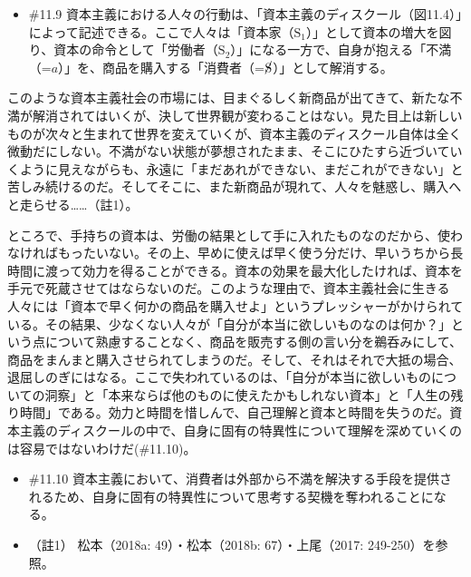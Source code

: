 \begin{note}{}
  \begin{itemize}
    \tightlist
    \item{\#11.9}
      資本主義における人々の行動は、「資本主義のディスクール（図11.4）」によって記述できる。ここで人々は「資本家（$\textrm{S}_1$）」として資本の増大を図り、資本の命令として「労働者（$\textrm{S}_2$）」になる一方で、自身が抱える「不満（=$a$）」を、商品を購入する「消費者（=$\cancel{\textrm{S}}$）」として解消する。
  \end{itemize}
\end{note}

このような資本主義社会の市場には、目まぐるしく新商品が出てきて、新たな不満が解消されてはいくが、決して世界観が変わることはない。見た目上は新しいものが次々と生まれて世界を変えていくが、資本主義のディスクール自体は全く微動だにしない。不満がない状態が夢想されたまま、そこにひたすら近づいていくように見えながらも、永遠に「まだあれができない、まだこれができない」と苦しみ続けるのだ。そしてそこに、また新商品が現れて、人々を魅惑し、購入へと走らせる\ldots\ldots（註1）。

ところで、手持ちの資本は、労働の結果として手に入れたものなのだから、使わなければもったいない。その上、早めに使えば早く使う分だけ、早いうちから長時間に渡って効力を得ることができる。資本の効果を最大化したければ、資本を手元で死蔵させてはならないのだ。このような理由で、資本主義社会に生きる人々には「資本で早く何かの商品を購入せよ」というプレッシャーがかけられている。その結果、少なくない人々が「自分が本当に欲しいものなのは何か？」という点について熟慮することなく、商品を販売する側の言い分を鵜呑みにして、商品をまんまと購入させられてしまうのだ。そして、それはそれで大抵の場合、退屈しのぎにはなる。ここで失われているのは、「自分が本当に欲しいものについての洞察」と「本来ならば他のものに使えたかもしれない資本」と「人生の残り時間」である。効力と時間を惜しんで、自己理解と資本と時間を失うのだ。資本主義のディスクールの中で、自身に固有の特異性について理解を深めていくのは容易ではないわけだ(\#11.10)。

\begin{note}{}
  \begin{itemize}
    \tightlist
    \item{\#11.10}
      資本主義において、消費者は外部から不満を解決する手段を提供されるため、自身に固有の特異性について思考する契機を奪われることになる。
  \end{itemize}
\end{note}

\begin{itemize}
\tightlist
\item
  （註1） 松本（2018a: 49）\cite{Matsumoto1}・松本（2018b:
  67）\cite{Matsumoto2}・上尾（2017: 249-250）\cite{Ueo}を参照。
\end{itemize}

